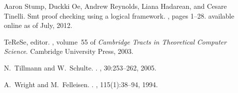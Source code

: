 \documentclass{LMCS}
\begin{document}
\begin{thebibliography}{10}
Aaron Stump, Duckki Oe, Andrew Reynolds, Liana Hadarean, and Cesare Tinelli.
\newblock Smt proof checking using a logical framework.
, pages 1--28.
\newblock available online as of July, 2012.

TeReSe, editor.
, volume~55 of {\em Cambridge Tracts in
  Theoretical Computer Science}.
\newblock Cambridge University Press, 2003.

N.~Tillmann and W.~Schulte.
.
, 30:253--262, 2005.

A.~Wright and M.~Felleisen.
.
, 115(1):38--94, 1994.

\end{thebibliography}
\end{document}

